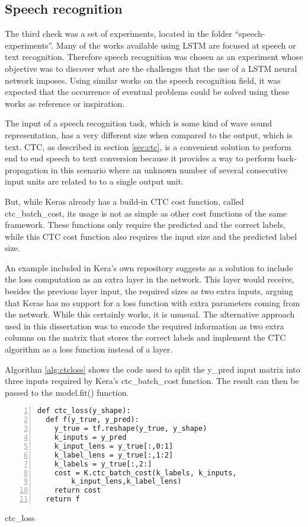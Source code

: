 \subsection{Speech recognition}
The third check was a set of experiments, located in the folder ``speech-experiments''. Many of the works available using LSTM are focused at speech or text recognition. Therefore speech recognition was chosen as an experiment whose objective was to discover what are the challenges that the use of a LSTM neural network imposes. Using similar works on the speech recognition field, it was expected that the occurrence of eventual problems could be solved using these works as reference or inspiration.

The input of a speech recognition task, which is some kind of wave sound representation, has a very different size when compared to the output, which is text. CTC, as described in section \ref{sec:ctc},
is a convenient solution to perform end to end speech to text conversion because it provides a way to perform back-propagation in this scenario where an unknown number of several consecutive input units are related to to a single output unit.

But, while Keras already has a build-in CTC cost function, called ctc\_batch\_cost, its usage is not as simple as other cost functions of the same framework. These functions only require the predicted and the correct labels, while this CTC cost function also requires the input size and the predicted label size. 

An example included in Kera's own repository
suggests as a solution to include the loss computation as an extra layer in the network. This layer would receive, besides the previous layer input, the required sizes as two extra inputs, arguing that Keras has no support for a loss function with extra parameters coming from the network. 
While this certainly works, it is unusual. The alternative approach used in this dissertation was to encode the required information as two extra columns on the matrix that stores the correct labels and implement the CTC algorithm as a loss function instead of a layer.
 
Algorithm \ref{alg:ctcloss} shows the code used to split the y\_pred input matrix into three inputs required by Kera's ctc\_batch\_cost function. The result can then be passed to the model.fit() function.

\noindent
\begin{algorithm}
\begin{lstlisting}[frame=single, numbers=left]
def ctc_loss(y_shape):
  def f(y_true, y_pred):
    y_true = tf.reshape(y_true, y_shape)
    k_inputs = y_pred
    k_input_lens = y_true[:,0:1]
    k_label_lens = y_true[:,1:2]
    k_labels = y_true[:,2:]
    cost = K.ctc_batch_cost(k_labels, k_inputs,
        k_input_lens,k_label_lens)
    return cost
  return f
\end{lstlisting}
\caption{\label{alg:ctcloss}ctc\_loss}
\end{algorithm}

